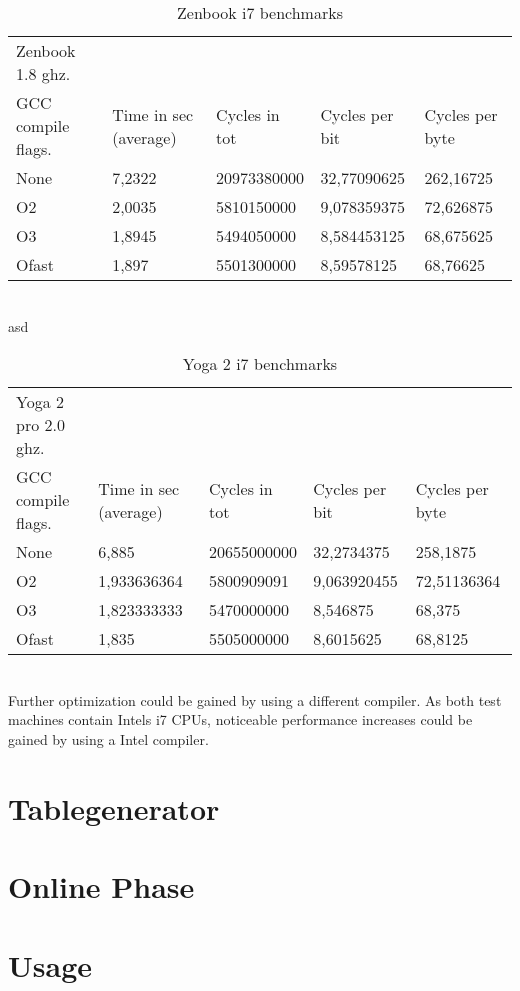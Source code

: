 \begin{table}[h!]
    \begin{tabular}{l|l|l|l|l}
     Zenbook 1.8 ghz.  & ~                     & ~             & ~              & ~               \\
    GCC compile flags. & Time in sec (average) & Cycles in tot & Cycles per bit & Cycles per byte \\ \hline
    None               & 7,2322                & 20973380000   & 32,77090625    & 262,16725       \\ \hline
    O2                 & 2,0035                & 5810150000    & 9,078359375    & 72,626875       \\ \hline
    O3                 & 1,8945                & 5494050000    & 8,584453125    & 68,675625       \\ \hline
    Ofast              & 1,897                 & 5501300000    & 8,59578125     & 68,76625        \\
    \end{tabular}
    \caption{Zenbook i7 benchmarks}
    \label{tab:zen}
\end{table}\\
asd
\begin{table}[h!]
    \begin{tabular}{l|l|l|l|l}
     Yoga 2 pro 2.0 ghz. & ~                     & ~             & ~              & ~               \\
    GCC compile flags.   & Time in sec (average) & Cycles in tot & Cycles per bit & Cycles per byte \\ \hline
    None                 & 6,885                 & 20655000000   & 32,2734375     & 258,1875        \\ \hline
    O2                   & 1,933636364           & 5800909091    & 9,063920455    & 72,51136364     \\ \hline
    O3                   & 1,823333333           & 5470000000    & 8,546875       & 68,375          \\ \hline
    Ofast                & 1,835                 & 5505000000    & 8,6015625      & 68,8125         \\
    \end{tabular}
    \caption{Yoga 2 i7 benchmarks}
    \label{tab:yoga}
\end{table}\\

Further optimization could be gained by using a different compiler. As
both test machines contain Intels i7 CPUs, noticeable performance
increases could be gained by using a Intel compiler.


\section{Tablegenerator}

\section{Online Phase}

\section{Usage}


